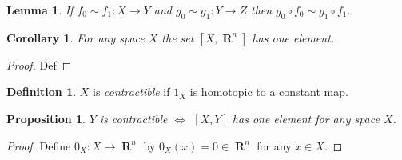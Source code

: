 \documentclass{article}
\newtheorem*{lem}{Lemma}
\newtheorem*{cor}{Corollary}
\newtheorem*{prop}{Proposition}
\theoremstyle{definition}
\newtheorem*{defn}{Definition}
\DeclareMathOperator{\RR}{\mathbf{R}}
\begin{document}
\begin{lem}
If $f_0 \sim f_1\colon X \to Y$ and $g_0 \sim g_1\colon Y \to Z$ then $g_0\circ f_0 \sim g_1\circ f_1$.
\end{lem}

\begin{cor}
For any space $X$ the set $[X,\RR^n]$ has one element.
\end{cor}
\begin{proof}
Def 
\end{proof}

\begin{defn}
$X$ is \emph{contractible} if $1_X$ is homotopic to a constant map.
\end{defn}

\begin{prop}
$Y$ is contractible $\iff$ $[X,Y]$ has one element for any space $X$.
\end{prop}

\begin{proof}
Define $0_X\colon X \to \RR^n$ by $0_X(x) = 0 \in \RR^n$ for any $x\in X$.
\end{proof}
\end{document}
